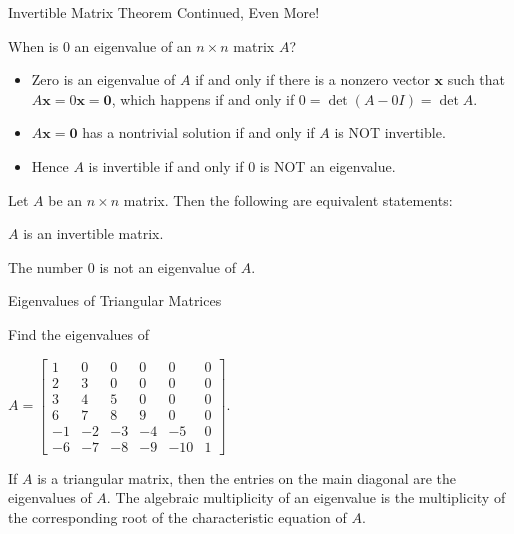 \documentclass[xcolor=dvipsnames,aspectratio=169,t]{beamer}
\begin{document}
\begin{frame}{Invertible Matrix Theorem Continued, Even More!}
  \medskip
  
  When is $0$ an eigenvalue of an $n\times n$ matrix $A$?
  \medskip

  \pause
  \begin{itemize}
  \item \alert{Zero is an eigenvalue} of $A$ if and only if there is a nonzero vector $\mathbf{x}$ such that $A \mathbf{x} = 0 \mathbf{x} = \mathbf{0}$, which happens if and only if $0 = \det(A - 0I) = \det A$.  \ms
  \pause
  \item $A \mathbf{x} = \mathbf{0}$ has a nontrivial solution if and only if $A$ is \alert{NOT invertible}. \ms
  \item Hence $A$ is invertible if and only if $0$ is NOT an eigenvalue.
  \end{itemize}
  \bigskip
  
  \pause
  \begin{theorem}
  Let $A$ be an $n \times n$ matrix. Then the following are equivalent statements:

  \bb[(a)]
  \ii $A$ is an invertible matrix.
  \smallskip
  \addtocounter{enumi}{16}
  \ii The number \alert{$0$ is not an eigenvalue} of $A$.
  \ee
  \end{theorem}
\end{frame}

\begin{frame}{Eigenvalues of Triangular Matrices}
  \smallskip

  Find the eigenvalues of

  $A = \begin{bmatrix}
  1 & 0 & 0 & 0 & 0 & 0 \\
  2 & 3 & 0 & 0 & 0 & 0 \\
  3 & 4 & 5 & 0 & 0 & 0 \\
  6 & 7 & 8 & 9 & 0 & 0 \\
  -1 & -2 & -3 & -4 & -5 & 0 \\
  -6 & -7 & -8 & -9 & -10 & 1 \end{bmatrix}.$

  \vspace{0.2in}

  \bbox
  \bi
  \ii If $A$ is a \alert{triangular matrix}, then the \alert{entries on the main diagonal} are the eigenvalues of $A$.
  \ii The \alert{algebraic multiplicity of an eigenvalue} is the multiplicity of the corresponding root of the characteristic equation of $A$.
  \ei
  \ebox
\end{frame}
\end{document}
